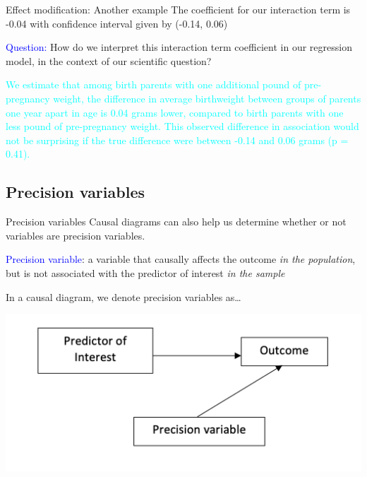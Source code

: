 \documentclass[10pt,t]{beamer}
\begin{document}
\begin{frame}{Effect modification: Another example}
The coefficient for our interaction term is -0.04 with confidence interval given by (-0.14, 0.06)

\vspace{0.3cm}

\textcolor{blue}{Question:} How do we interpret this interaction term coefficient in our regression model, in the context of our scientific question? \pause

\vspace{0.3cm}
\textcolor{cyan}{We estimate that among birth parents with one additional pound of pre-pregnancy weight, the difference in average birthweight between groups of parents one year apart in age is 0.04 grams lower, compared to birth parents with one less pound of pre-pregnancy weight. This observed difference in association would not be surprising if the true difference were between -0.14 and 0.06 grams (p = 0.41).}

\end{frame}

\subsection{Precision variables}

\begin{frame}{Precision variables}
Causal diagrams can also help us determine whether or not variables are precision variables.

\vspace{0.3cm}

\textcolor{blue}{Precision variable}: a variable that causally affects the outcome \textit{in the population}, but is not associated with the predictor of interest \textit{in the sample} \pause

\vspace{0.3cm}

In a causal diagram, we denote precision variables as\dots

\vspace{0.3cm}

\centering \includegraphics[scale=0.4]{precvar1.png}

\end{frame}
\end{document}
